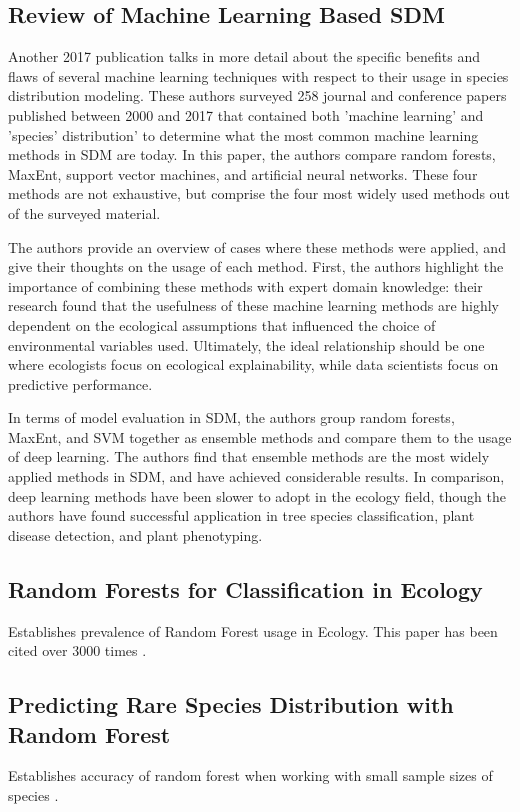 \documentclass[12pt, oneside]{article}
\begin{document}
\begin{normalsize}
\subsection{Review of Machine Learning Based SDM}

Another 2017 publication talks in more detail about the specific benefits and flaws of several machine learning techniques with respect to their usage in species distribution modeling.  These authors surveyed 258 journal and conference papers published between 2000 and 2017 that contained both 'machine learning' and 'species' distribution' to determine what the most common machine learning methods in SDM are today. In this paper, the authors compare random forests, MaxEnt, support vector machines, and artificial neural networks. These four methods are not exhaustive, but comprise the four most widely used methods out of the surveyed material. 

The authors provide an overview of cases where these methods were applied, and give their thoughts on the usage of each method. First, the authors highlight the importance of combining these methods with expert domain knowledge: their research found that the usefulness of these machine learning methods are highly dependent on the ecological assumptions that influenced the choice of environmental variables used. Ultimately, the ideal relationship should be one where ecologists focus on ecological explainability, while data scientists focus on predictive performance.

In terms of model evaluation in SDM, the authors group random forests, MaxEnt, and SVM together as ensemble methods and compare them to the usage of deep learning. The authors find that ensemble methods are the most widely applied methods in SDM, and have achieved considerable results. In comparison, deep learning methods have been slower to adopt in the ecology field, though the authors have found successful application in tree species classification, plant disease detection, and plant phenotyping. 

\cite{8328619}


\subsection{Random Forests for Classification in Ecology}

Establishes prevalence of Random Forest usage in Ecology. This paper has been cited over 3000 times \cite{cutler2007random}.

\subsection{Predicting Rare Species Distribution with Random Forest}

Establishes accuracy of random forest when working with small sample sizes of species \cite{mi2017choose}.

\end{normalsize}
\end{document}
